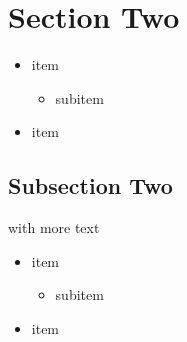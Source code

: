 \section{Section Two}
\begin{frame}[fragile]{\insertsection}{}
  \begin{itemize}
    \item item
    \begin{itemize}
      \item subitem
    \end{itemize}
    \item item
  \end{itemize}
\end{frame}

\subsection{Subsection Two}
\begin{frame}[fragile]{\insertsection with more text}{\insertsubsection}
  \begin{itemize}
    \item item
    \begin{itemize}
      \item subitem
    \end{itemize}
    \item item
  \end{itemize}
\end{frame}